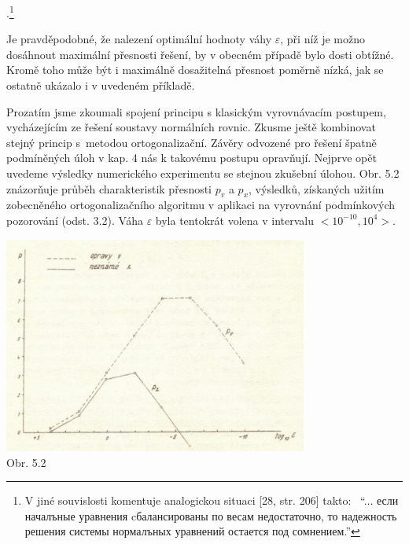 %
%
.\footnote%
{
V jiné souvislosti komentuje analogickou situaci 
[28, str. 206] takto:~
%
``... если началъные уравнения cбалансированы по весам
недостаточно, то надежность решения системы нормалъных
уравнений остается под сомнением.''
%
}
%
%
%
%
%
%


Je pravděpodobné, že nalezení
optimální hodnoty váhy $\varepsilon$, při níž je možno dosáhnout
maximální přesnosti řešení, by v obecném případě bylo dosti
obtížné. Kromě toho může být i maximálně dosažitelná přesnost poměrně
nízká, jak se ostatně ukázalo i v uvedeném příkladě.

Prozatím jsme zkoumali spojení  principu s klasickým
vyrovnávacím postupem, vycházejícím ze řešení soustavy
normálních rovnic. Zkusme ještě kombinovat stejný princip s~metodou
ortogonalizační. Závěry odvozené pro řešení špatně podmíněných
úloh v kap. 4 nás k takovému postupu opravňují. Nejprve opět
uvedeme výsledky numerického experimentu se stejnou zkušební
úlohou.  Obr. 5.2 znázorňuje průběh charakteristik přesnosti $p_v$ a
$p_x$, výsledků, získaných užitím zobecněného ortogonalizačního
algoritmu v aplikaci na vyrovnání podmínkových pozorování (odst.
3.2). Váha $\varepsilon$ byla tentokrát volena v intervalu
$<\!10^{-10}, 10^4\!>$.


\begin{center}
\includegraphics[width=0.75\textwidth]{obr_5.2.png}\\
Obr. 5.2
\end{center}

